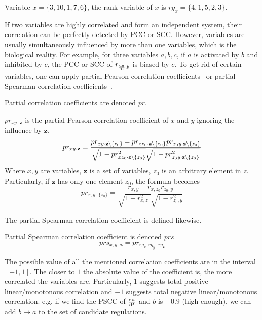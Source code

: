 \begin{example}
Variable $x=\{3,10,1,7,6\}$, the rank variable of $x$ is $rg_x=\{4,1,5,2,3\}$.
\end{example}


If two variables are highly correlated and form an independent system, their correlation can be perfectly detected by PCC or SCC.
However, variables are usually simultaneously influenced by more than one variables, which is the biological reality.
For example, for three variables $a,b,c$, if $a$ is activated by $b$ and inhibited by $c$, the PCC or SCC of $r_{\frac{{\rm d}a}{{\rm d}t},b}$ is biased by $c$. 
To get rid of certain variables, one can apply partial Pearson correlation coefficients~\cite{baba2004partial} or partial Spearman correlation coefficients~\cite{borror2001practical}.

Partial correlation coefficients are denoted $pr$.

\begin{definition}\label{def:PPCC}
    $pr_{xy\cdot \mathbf {z}}$ is the partial Pearson correlation coefficient of $x$ and $y$ ignoring the influence by $\mathbf {z}$.
    $$pr _{xy\cdot \mathbf {z} }={\frac {pr _{xy\cdot \mathbf {z} \setminus\{z_{0}\}}-pr _{xz_{0}\cdot \mathbf {z} \setminus\{z_{0}\}}pr _{z_{0}y\cdot \mathbf {z} \setminus\{z_{0}\}}}{{\sqrt {1-pr _{xz_{0}\cdot \mathbf {z} \setminus\{z_{0}\}}^{2}}}{\sqrt {1-pr _{z_{0}y\cdot \mathbf {z} \setminus\{z_{0}\}}^{2}}}}}$$
    Where $x,y$ are variables, $\mathbf {z}$ is a set of variables, $z_0$ is an arbitrary element in $z$. 
    Particularly, if $\mathbf {z}$ has only one element $z_0$, the formula becomes
    $$pr_{x,y\cdot \{z_0\}}={\frac {r _{x,y}-r _{x,z_0}r _{z_0,y}}{{\sqrt {1-r _{x,z_0}^{2}}}{\sqrt {1-r _{z_0,y}^{2}}}}}$$

\end{definition}

The partial Spearman correlation coefficient is defined likewise.
\begin{definition}\label{def:PSCC}
Partial Spearman correlation coefficient is denoted $prs$
    $$prs_{x,y\cdot \mathbf {z}}=pr_{rg_x,rg_y\cdot rg_\mathbf {z}}$$%
\end{definition}

The possible value of all the mentioned correlation coefficients are in the interval $[-1,1]$.
The closer to $1$ the absolute value of the coefficient is, the more correlated the variables are.
Particularly, $1$ suggests total positive linear/monotonous correlation and $-1$ suggests total negative linear/monotonous correlation. 
e.g. if we find the PSCC of $\frac{{\rm d}a}{{\rm d}t}$ and $b$ is $-0.9$ (high enough), we can add $b\xrightarrow{-}a$ to the set of candidate regulations.

